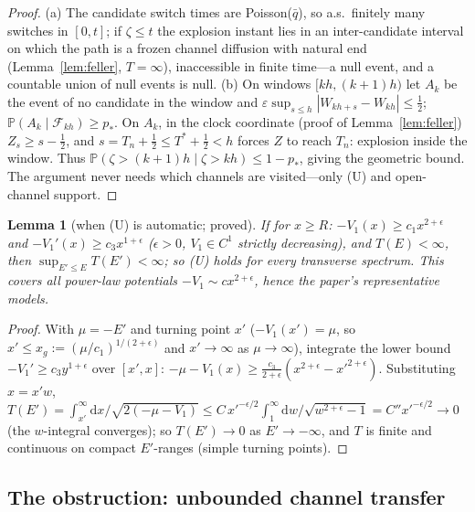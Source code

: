 \documentclass[11pt]{article}
\newtheorem{lemma}[theorem]{Lemma}
\theoremstyle{definition}
\theoremstyle{remark}
\newcommand{\dd}{\mathrm{d}}
\newcommand{\Prob}{\mathbb{P}}
\begin{document}
\begin{proof}
(a) The candidate switch times are Poisson($\bar q$), so a.s.\ finitely
many switches in $[0,t]$; if $\zeta\le t$ the explosion instant lies in
an inter-candidate interval on which the path is a frozen channel
diffusion with natural end (Lemma~\ref{lem:feller}, $T=\infty$),
inaccessible in finite time---a null event, and a countable union of
null events is null. (b) On windows $[kh,(k+1)h)$ let $A_{k}$ be the
event of no candidate in the window and
$\varepsilon\sup_{s\le h}|W_{kh+s}-W_{kh}|\le\tfrac12$;
$\Prob(A_{k}\mid\mathcal F_{kh})\ge p_{*}$. On $A_{k}$, in the clock
coordinate (proof of Lemma~\ref{lem:feller}) $Z_{s}\ge s-\tfrac12$, and
$s=T_{n}+\tfrac12\le T^{*}+\tfrac12<h$ forces $Z$ to reach $T_{n}$:
explosion inside the window. Thus
$\Prob(\zeta>(k+1)h\mid\zeta>kh)\le1-p_{*}$, giving the geometric
bound. The argument never needs which channels are visited---only (U)
and open-channel support.
\end{proof}

\begin{lemma}[when (U) is automatic; proved]\label{lem:app-U}
If for $x\ge R$: $-V_{1}(x)\ge c_{1}x^{2+\epsilon}$ and
$-V_{1}'(x)\ge c_{3}x^{1+\epsilon}$ ($\epsilon>0$, $V_{1}\in C^{1}$
strictly decreasing), and $T(E)<\infty$, then
$\sup_{E'\le E}T(E')<\infty$; so (U) holds for every transverse
spectrum. This covers all power-law potentials
$-V_{1}\sim cx^{2+\epsilon}$, hence the paper's representative models.
\end{lemma}

\begin{proof}
With $\mu=-E'$ and turning point $x'$ ($-V_{1}(x')=\mu$, so
$x'\le x_{g}:=(\mu/c_{1})^{1/(2+\epsilon)}$ and $x'\to\infty$ as
$\mu\to\infty$), integrate the lower bound $-V_{1}'\ge c_{3}y^{1+\epsilon}$
over $[x',x]$: $-\mu-V_{1}(x)\ge\tfrac{c_{3}}{2+\epsilon}
(x^{2+\epsilon}-x'^{2+\epsilon})$. Substituting $x=x'w$,
$T(E')=\int_{x'}^{\infty}\dd x/\sqrt{2(-\mu-V_{1})}\le
C\,x'^{-\epsilon/2}\int_{1}^{\infty}\dd w/\sqrt{w^{2+\epsilon}-1}
=C''x'^{-\epsilon/2}\to0$ (the $w$-integral converges); so $T(E')\to0$ as
$E'\to-\infty$, and $T$ is finite and continuous on compact $E'$-ranges
(simple turning points).
\end{proof}

\subsection{The obstruction: unbounded channel transfer}
\label{app:multiD-obstruction}
\end{document}
